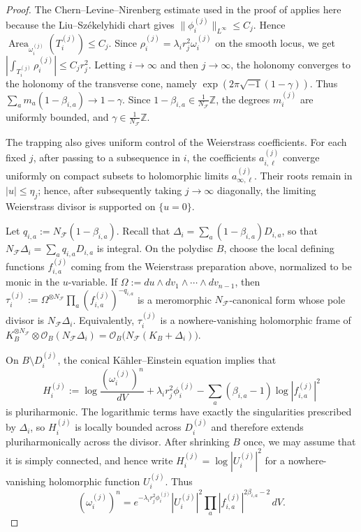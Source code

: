 \documentclass[11pt]{amsart}
\theoremstyle{definition}
\theoremstyle{remark}
\begin{document}
\begin{proof}
The Chern--Levine--Nirenberg estimate used in the proof of
\cite[Proposition~13]{CDSII} applies here because the Liu--Sz\'ekelyhidi chart gives
$\|\phi_i^{(j)}\|_{L^\infty}\leq C_j$. Hence
$\operatorname{Area}_{\omega_i^{(j)}}(T_i^{(j)})\leq C_j$. Since
$\rho_i^{(j)}=\lambda_i r_j^2\omega_i^{(j)}$ on the smooth locus, we get
$|\int_{T_i^{(j)}}\rho_i^{(j)}|\leq C_j r_j^2$. Letting $i\to\infty$ and then
$j\to\infty$, the holonomy converges to the holonomy of the transverse cone,
namely $\exp(2\pi\sqrt{-1}(1-\gamma))$. Thus
$\sum_a m_a(1-\beta_{i,a})\to 1-\gamma$. Since
$1-\beta_{i,a}\in \frac1{N_{\mathcal F}}\mathbb Z$, the degrees
$m_i^{(j)}$ are uniformly bounded, and $\gamma\in\frac1{N_{\mathcal F}}\mathbb Z$.

The trapping also gives uniform control of the Weierstrass coefficients. For
each fixed $j$, after passing to a subsequence in $i$, the coefficients
$a_{i,\ell}^{(j)}$ converge uniformly on compact subsets to holomorphic limits
$a_{\infty,\ell}^{(j)}$. Their roots remain in $|u|\leq\eta_j$; hence, after
subsequently taking $j\to\infty$ diagonally, the limiting Weierstrass divisor is
supported on $\{u=0\}$.

Let $q_{i,a}:=N_{\mathcal F}(1-\beta_{i,a})$. Recall that
$\Delta_i=\sum_a(1-\beta_{i,a})D_{i,a}$, so that
$N_{\mathcal F}\Delta_i=\sum_a q_{i,a}D_{i,a}$ is integral. On the polydisc
$B$, choose the local defining functions $f_{i,a}^{(j)}$ coming from the
Weierstrass preparation above, normalized to be monic in the $u$-variable. If
$\Omega:=du\wedge dv_1\wedge\cdots\wedge dv_{n-1}$, then
$\tau_i^{(j)}
:=
\Omega^{\otimes N_{\mathcal F}}
\prod_a(f_{i,a}^{(j)})^{-q_{i,a}}
$
is a meromorphic $N_{\mathcal F}$-canonical form whose pole divisor is
$N_{\mathcal F}\Delta_i$. Equivalently, $\tau_i^{(j)}$ is a nowhere-vanishing
holomorphic frame of $K_B^{\otimes N_{\mathcal F}}
\otimes \mathcal O_B(N_{\mathcal F}\Delta_i)
=
\mathcal O_B\bigl(N_{\mathcal F}(K_B+\Delta_i)\bigr).
$


On $B\setminus D_i^{(j)}$, the conical K\"ahler--Einstein equation implies that
\[
H_i^{(j)}
:=
\log\frac{(\omega_i^{(j)})^n}{dV}
+\lambda_i r_j^2\phi_i^{(j)}
-\sum_a(\beta_{i,a}-1)\log|f_{i,a}^{(j)}|^2
\]
is pluriharmonic. The logarithmic terms have exactly the singularities
prescribed by $\Delta_i$, so $H_i^{(j)}$ is locally bounded across
$D_i^{(j)}$ and therefore extends pluriharmonically across the divisor. After
shrinking $B$ once, we may assume that it is simply connected, and hence write
$H_i^{(j)}=\log|U_i^{(j)}|^2$ for a nowhere-vanishing holomorphic function
$U_i^{(j)}$. Thus
\[
(\omega_i^{(j)})^n
=
e^{-\lambda_i r_j^2\phi_i^{(j)}}
|U_i^{(j)}|^2
\prod_a |f_{i,a}^{(j)}|^{2\beta_{i,a}-2}\,dV.
\]


\end{proof}
\end{document}
